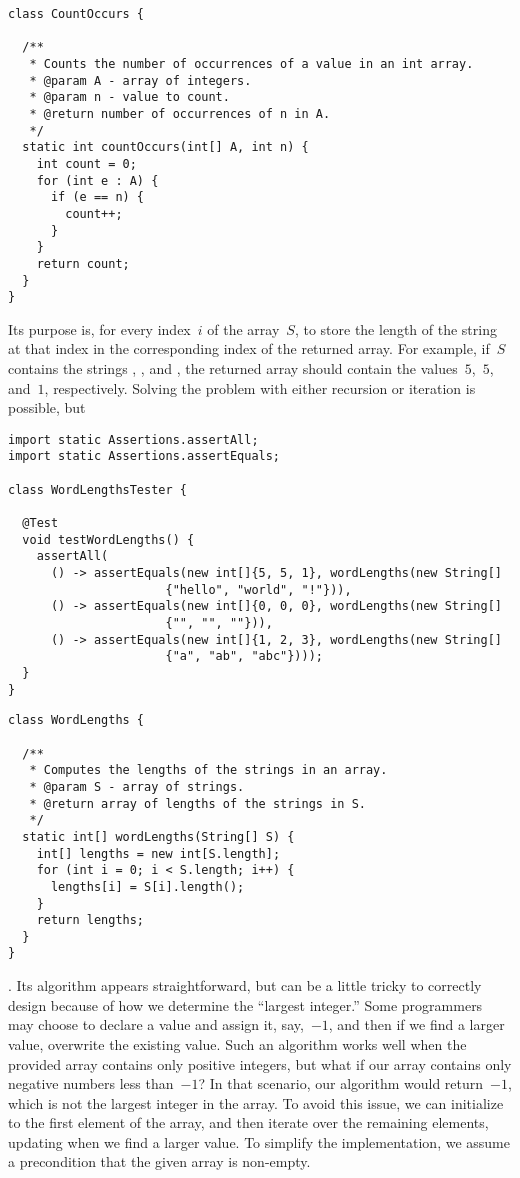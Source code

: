\begin{lstlisting}[language=MyJava]
class CountOccurs {

  /** 
   * Counts the number of occurrences of a value in an int array.
   * @param A - array of integers.
   * @param n - value to count.
   * @return number of occurrences of n in A.
   */
  static int countOccurs(int[] A, int n) {
    int count = 0;
    for (int e : A) {
      if (e == n) { 
        count++; 
      }
    }
    return count;
  }
}
\end{lstlisting}

Its purpose is, for every index~$i$ of the array~$S$, to store the length of the string at that index in the corresponding index of the returned array.
For example, if~$S$ contains the strings , , and , the returned array should contain the values~$5$,~$5$, and~$1$, respectively.
Solving the problem with either recursion or iteration is possible, but

\begin{lstlisting}[language=MyJava]
import static Assertions.assertAll;
import static Assertions.assertEquals;

class WordLengthsTester {

  @Test
  void testWordLengths() {
    assertAll(
      () -> assertEquals(new int[]{5, 5, 1}, wordLengths(new String[]
                      {"hello", "world", "!"})),
      () -> assertEquals(new int[]{0, 0, 0}, wordLengths(new String[]
                      {"", "", ""})),
      () -> assertEquals(new int[]{1, 2, 3}, wordLengths(new String[]
                      {"a", "ab", "abc"})));
  }
}
\end{lstlisting}

\begin{lstlisting}[language=MyJava]
class WordLengths {

  /**
   * Computes the lengths of the strings in an array.
   * @param S - array of strings.
   * @return array of lengths of the strings in S.
   */
  static int[] wordLengths(String[] S) {
    int[] lengths = new int[S.length];
    for (int i = 0; i < S.length; i++) {
      lengths[i] = S[i].length();
    }
    return lengths;
  }
}
\end{lstlisting}

. Its algorithm appears straightforward, but can be a little tricky to correctly design because of how we determine the ``largest integer.'' 
Some programmers may choose to declare a value  and assign it, say,~$-1$, and then if we find a larger value, overwrite the existing value. 
Such an algorithm works well when the provided array contains only positive integers, but what if our array contains only negative numbers less than~$-1$? 
In that scenario, our algorithm would return~$-1$, which is not the largest integer in the array. 
To avoid this issue, we can initialize  to the first element of the array, and then iterate over the remaining elements, updating  when we find a larger value.
To simplify the implementation, we assume a precondition that the given array is non-empty.

